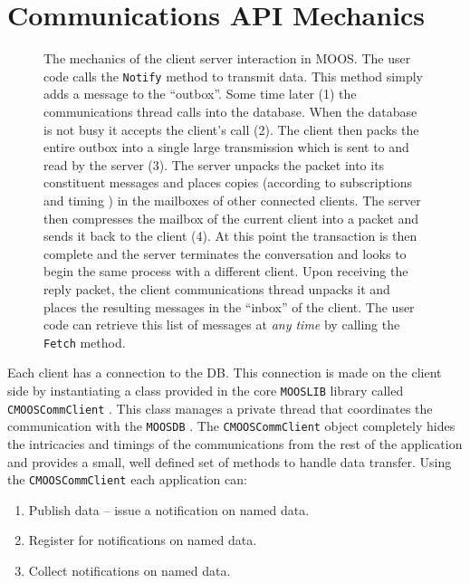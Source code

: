 \documentclass[a4paper,10pt]{article}
\newcommand{\Code}[1]{\texttt{#1} }
\newcommand{\code}[1]{\Code{#1} }
\newcommand{\DB}   {\code{{MOOSDB}}}
\begin{document}
\section{Communications API Mechanics}
\begin{figure*}[ht!]
\centering {}
\caption{The mechanics of the client server interaction in MOOS.
The user code calls the \code{Notify} method to transmit data.
This method simply adds a message to the ``outbox''. Some time
later (1) the communications thread calls into the database. When
the database is not busy it accepts the client's call (2). The
client then packs the entire outbox into a single large
transmission which is sent to and read by the server (3). The
server unpacks the packet into its constituent messages and places
copies (according to subscriptions and timing ) in the mailboxes
of other connected clients. The server then compresses the mailbox
of the current client into a packet and sends it back to the
client (4). At this point the transaction is then complete and the
server terminates the conversation and looks to begin the same
process with a different client. Upon receiving the reply packet,
the client communications thread unpacks it and places the
resulting messages in the ``inbox'' of the client. The user code
can retrieve this list of messages at {\it{any time}} by calling
the \code{Fetch} method.}
\end{figure*}

Each client has a connection to the DB. This connection is made on
the client side by instantiating a class provided in the core
\code{MOOSLIB} library called \code{CMOOSCommClient}. This class
manages a private thread that coordinates the communication with
the \DB. The \code{CMOOSCommClient} object completely hides the
intricacies and timings of the communications from the rest of the
application and provides a small, well defined set of methods to
handle data transfer. Using the \code{CMOOSCommClient} each
application can:
\begin{enumerate}
\item Publish data -- issue a notification on named data.
\item Register for notifications on named data.
\item Collect notifications on named data.
\end{enumerate}
\end{document}
